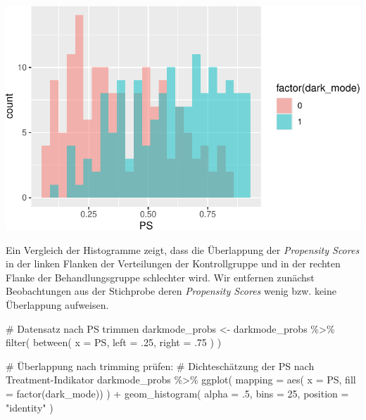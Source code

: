 \documentclass[
  a4paper,
  DIV=11,
  oneside]{scrreprt}
\newenvironment{Shaded}{\begin{snugshade}}{\end{snugshade}}
\newcommand{\AttributeTok}[1]{\textcolor[rgb]{0.40,0.45,0.13}{#1}}
\newcommand{\CommentTok}[1]{\textcolor[rgb]{0.37,0.37,0.37}{#1}}
\newcommand{\DecValTok}[1]{\textcolor[rgb]{0.68,0.00,0.00}{#1}}
\newcommand{\FunctionTok}[1]{\textcolor[rgb]{0.28,0.35,0.67}{#1}}
\newcommand{\NormalTok}[1]{\textcolor[rgb]{0.00,0.23,0.31}{#1}}
\newcommand{\OtherTok}[1]{\textcolor[rgb]{0.00,0.23,0.31}{#1}}
\newcommand{\SpecialCharTok}[1]{\textcolor[rgb]{0.37,0.37,0.37}{#1}}
\newcommand{\StringTok}[1]{\textcolor[rgb]{0.13,0.47,0.30}{#1}}
\begin{document}
\includegraphics{Matching_files/figure-pdf/unnamed-chunk-21-1.pdf}

Ein Vergleich der Histogramme zeigt, dass die Überlappung der
\emph{Propensity Scores} in der linken Flanken der Verteilungen der
Kontrollgruppe und in der rechten Flanke der Behandlungsgruppe
schlechter wird. Wir entfernen zunächst Beobachtungen aus der Stichprobe
deren \emph{Propensity Scores} wenig bzw. keine Überlappung aufweisen.

\begin{Shaded}
\begin{Highlighting}[]
\CommentTok{\# Datensatz nach PS trimmen}
\NormalTok{darkmode\_probs }\OtherTok{\textless{}{-}}\NormalTok{ darkmode\_probs }\SpecialCharTok{\%\textgreater{}\%} 
  \FunctionTok{filter}\NormalTok{(}
    \FunctionTok{between}\NormalTok{(}
      \AttributeTok{x =}\NormalTok{ PS,}
      \AttributeTok{left =}\NormalTok{ .}\DecValTok{25}\NormalTok{,}
      \AttributeTok{right =}\NormalTok{ .}\DecValTok{75}
\NormalTok{    )}
\NormalTok{  )}
\end{Highlighting}
\end{Shaded}

\begin{Shaded}
\begin{Highlighting}[]
\CommentTok{\# Überlappung nach trimming prüfen:}
\CommentTok{\# Dichteschätzung der PS nach Treatment{-}Indikator}
\NormalTok{darkmode\_probs }\SpecialCharTok{\%\textgreater{}\%}
\FunctionTok{ggplot}\NormalTok{(}
  \AttributeTok{mapping =} \FunctionTok{aes}\NormalTok{(}
    \AttributeTok{x =}\NormalTok{ PS, }
    \AttributeTok{fill =} \FunctionTok{factor}\NormalTok{(dark\_mode))}
\NormalTok{  ) }\SpecialCharTok{+} 
  \FunctionTok{geom\_histogram}\NormalTok{(}
    \AttributeTok{alpha =}\NormalTok{ .}\DecValTok{5}\NormalTok{, }
    \AttributeTok{bins =} \DecValTok{25}\NormalTok{, }
    \AttributeTok{position =} \StringTok{"identity"}
\NormalTok{  )}
\end{Highlighting}
\end{Shaded}
\end{document}
